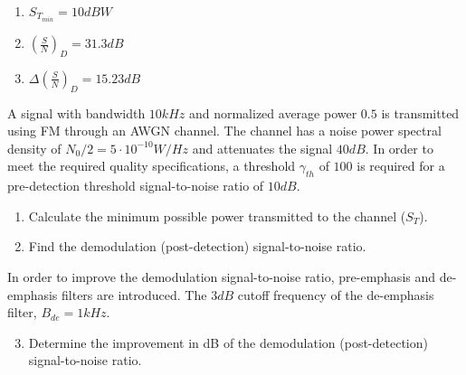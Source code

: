\documentclass[en,boletin]{uah}
\begin{document}
{
\begin{enumerate}
	\item $S_{T_{min}} = 10dBW$
	\item $\left ( \frac{S}{N} \right )_D = 31.3 dB$
	\item $\Delta \left ( \frac{S}{N} \right )_D = 15.23 dB$
\end{enumerate}
}
{

	A signal with bandwidth $10 kHz$ and normalized average power $0.5$ is transmitted using FM through an AWGN channel. The channel has a noise power spectral density of $N_0/2=5\cdot 10^{-10} W/Hz$ and attenuates the signal $40 dB$. In order to meet the required quality specifications, a threshold $\gamma_{th}$ of $100$ is required for a pre-detection threshold signal-to-noise ratio of $10 dB$. 

	\begin{enumerate}
		\item Calculate the minimum possible power transmitted to the channel ($S_T$).
		\item Find the demodulation (post-detection) signal-to-noise ratio.
	\end{enumerate}
	 
In order to improve the demodulation signal-to-noise ratio, pre-emphasis and de-emphasis filters are introduced. The $3 dB$ cutoff frequency of the de-emphasis filter, $B_{de}= 1 kHz$.

\begin{enumerate}\setcounter{enumi}{2}
	\item Determine the improvement in dB of the demodulation (post-detection) signal-to-noise ratio.
\end{enumerate}

}
\end{document}
